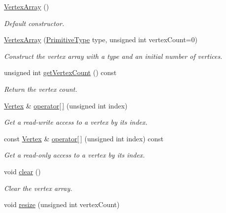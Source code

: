 \begin{DoxyCompactItemize}
\item 
\hyperlink{classsf_1_1_vertex_array_a15729e01df8fc0021f9774dfb56295c1}{Vertex\+Array} ()
\begin{DoxyCompactList}\small\item\em Default constructor. \end{DoxyCompactList}\item 
\hyperlink{classsf_1_1_vertex_array_abf85f4baff4c282e2d07ea97b5913aad}{Vertex\+Array} (\hyperlink{group__graphics_ga5ee56ac1339984909610713096283b1b}{Primitive\+Type} type, unsigned int vertex\+Count=0)
\begin{DoxyCompactList}\small\item\em Construct the vertex array with a type and an initial number of vertices. \end{DoxyCompactList}\item 
unsigned int \hyperlink{classsf_1_1_vertex_array_a683fa176683f3b0343bab164608378f9}{get\+Vertex\+Count} () const 
\begin{DoxyCompactList}\small\item\em Return the vertex count. \end{DoxyCompactList}\item 
\hyperlink{classsf_1_1_vertex}{Vertex} \& \hyperlink{classsf_1_1_vertex_array_a5db1da21b170ecf4c52d49030db385fd}{operator\mbox{[}$\,$\mbox{]}} (unsigned int index)
\begin{DoxyCompactList}\small\item\em Get a read-\/write access to a vertex by its index. \end{DoxyCompactList}\item 
const \hyperlink{classsf_1_1_vertex}{Vertex} \& \hyperlink{classsf_1_1_vertex_array_a0e95bde955c929651b0d9f8f00a354be}{operator\mbox{[}$\,$\mbox{]}} (unsigned int index) const 
\begin{DoxyCompactList}\small\item\em Get a read-\/only access to a vertex by its index. \end{DoxyCompactList}\item 
void \hyperlink{classsf_1_1_vertex_array_a3654c424aca1f9e468f369bc777c839c}{clear} ()
\begin{DoxyCompactList}\small\item\em Clear the vertex array. \end{DoxyCompactList}\item 
void \hyperlink{classsf_1_1_vertex_array_a9884c43c4f5ba152046ab3a5c91efb3b}{resize} (unsigned int vertex\+Count)

\end{DoxyCompactItemize}
